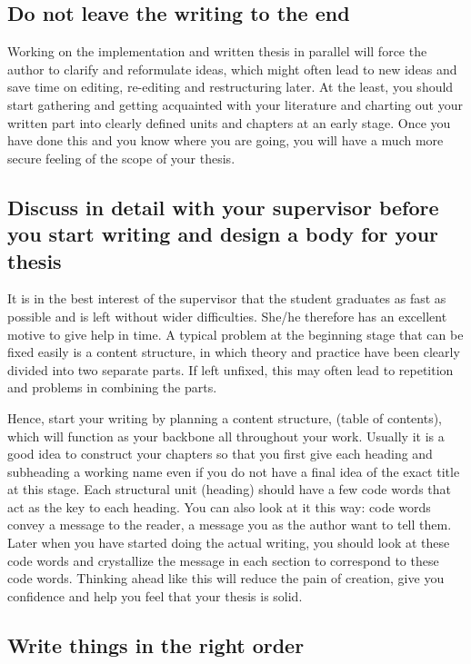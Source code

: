 \subsection{Do not leave the writing to the end}

Working on the implementation and written thesis in parallel will
force the author to clarify and reformulate ideas, which might often
lead to new ideas and save time on editing, re-editing and
restructuring later. At the least, you should start gathering and
getting acquainted with your literature and charting out your written
part into clearly defined units and chapters at an early stage. Once
you have done this and you know where you are going, you will have a
much more secure feeling of the scope of your thesis.

\subsection{Discuss in detail with your supervisor before you start writing and design a body for your thesis}

It is in the best interest of the supervisor that the student
graduates as fast as possible and is left without wider difficulties.
She/he therefore has an excellent motive to give help in time. A
typical problem at the beginning stage that can be fixed easily is a
content structure, in which theory and practice have been clearly
divided into two separate parts. If left unfixed, this may often lead
to repetition and problems in combining the parts.

Hence, start your writing by planning a content structure, (table of
contents), which will function as your backbone all throughout your
work. Usually it is a good idea to construct your chapters so that
you first give each heading and subheading a working name even if you
do not have a final idea of the exact title at this stage. Each
structural unit (heading) should have a few code words that act as
the key to each heading. You can also look at it this way: code words
convey a message to the reader, a message you as the author want to
tell them. Later when you have started doing the actual writing, you
should look at these code words and crystallize the message in each
section to correspond to these code words. Thinking ahead like this
will reduce the pain of creation, give you confidence and help you
feel that your thesis is solid.

\subsection{Write things in the right order}

